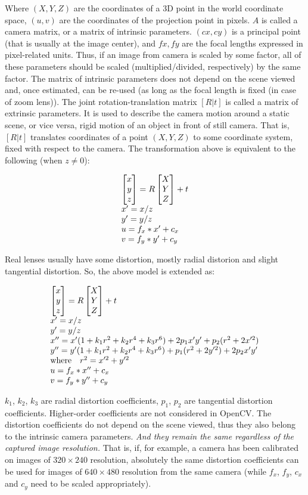 \begin{description}
Where $(X, Y, Z)$ are the coordinates of a 3D point in the world
coordinate space, $(u, v)$ are the coordinates of the projection point
in pixels. $A$ is called a camera matrix, or a matrix of
intrinsic parameters. $(cx, cy)$ is a principal point (that is
usually at the image center), and $fx, fy$ are the focal lengths
expressed in pixel-related units. Thus, if an image from camera is
scaled by some factor, all of these parameters should
be scaled (multiplied/divided, respectively) by the same factor. The
matrix of intrinsic parameters does not depend on the scene viewed and,
once estimated, can be re-used (as long as the focal length is fixed (in
case of zoom lens)). The joint rotation-translation matrix $[R|t]$
is called a matrix of extrinsic parameters. It is used to describe the
camera motion around a static scene, or vice versa, rigid motion of an
object in front of still camera. That is, $[R|t]$ translates
coordinates of a point $(X, Y, Z)$ to some coordinate system,
fixed with respect to the camera. The transformation above is equivalent
to the following (when $z \ne 0$):

\[
\begin{array}{l}
\begin{bmatrix} x\\ y\\ z \end{bmatrix} = R \begin{bmatrix} X\\ Y\\ Z \end{bmatrix} + t\\
x' = x/z\\
y' = y/z\\
u = f_x*x' + c_x\\
v = f_y*y' + c_y
\end{array}
\]

Real lenses usually have some distortion, mostly
radial distorion and slight tangential distortion. So, the above model
is extended as:

\[
\begin{array}{l}
\begin{bmatrix} x\\ y\\ z \end{bmatrix} = R \begin{bmatrix} X\\ Y\\ Z \end{bmatrix} + t\\
x' = x/z\\
y' = y/z\\
x'' = x' (1 + k_1 r^2 + k_2 r^4 + k_3 r^6) + 2 p_1 x' y' + p_2(r^2 + 2 x'^2) \\
y'' = y' (1 + k_1 r^2 + k_2 r^4 + k_3 r^6) + p_1 (r^2 + 2 y'^2) + 2 p_2 x' y' \\
\text{where} \quad r^2 = x'^2 + y'^2 \\
u = f_x*x'' + c_x\\
v = f_y*y'' + c_y
\end{array}
\]

$k_1$, $k_2$, $k_3$ are radial distortion coefficients, $p_1$, $p_2$ are tangential distortion coefficients.
Higher-order coefficients are not considered in OpenCV.
The distortion coefficients do not depend on the scene viewed, thus they also belong to the intrinsic camera parameters.
\emph{And they remain the same regardless of the captured image resolution.}
That is, if, for example, a camera has been calibrated on images of $320
\times 240$ resolution, absolutely the same distortion coefficients can
be used for images of $640 \times 480$ resolution from the same camera (while $f_x$,
$f_y$, $c_x$ and $c_y$ need to be scaled appropriately).


\end{description}
